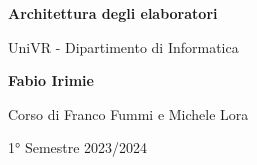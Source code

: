 \begin{titlepage}
	\begin{center}
		\vspace*{1cm}

		\Huge
		\textbf{Architettura degli elaboratori}

		\vspace{0.5cm}
		\LARGE
		UniVR - Dipartimento di Informatica

		\vspace{1.5cm}

		\textbf{Fabio Irimie}

		\vfill


		\vspace{0.8cm}

    Corso di Franco Fummi e Michele Lora

		1° Semestre 2023/2024

	\end{center}
\end{titlepage}
